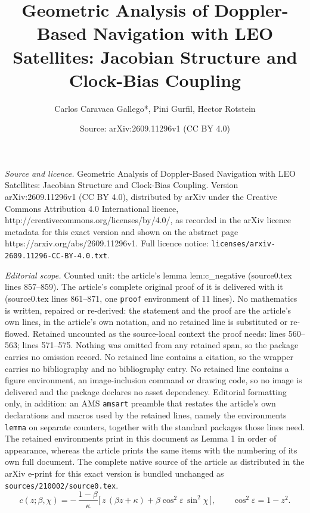 \documentclass[10pt,a4paper]{amsart}
\title{Geometric Analysis of Doppler-Based Navigation with LEO Satellites: Jacobian Structure and Clock-Bias Coupling}
\author{Carlos Caravaca Gallego*, Pini Gurfil, Hector Rotstein}
\date{Source: arXiv:2609.11296v1 (CC BY 4.0)}
\begin{document}
\maketitle

\noindent\emph{Source and licence.} Geometric Analysis of Doppler-Based Navigation with LEO Satellites: Jacobian Structure and Clock-Bias Coupling. Version arXiv:2609.11296v1 (CC BY 4.0), distributed by arXiv under the Creative Commons Attribution 4.0 International licence, http://creativecommons.org/licenses/by/4.0/, as recorded in the arXiv licence metadata for this exact version and shown on the abstract page https://arxiv.org/abs/2609.11296v1. Full licence notice: \texttt{licenses/arxiv-2609.11296-CC-BY-4.0.txt}.\par\smallskip

\noindent\textit{Editorial scope.} Counted unit: the article's lemma lem:c\_negative (source0.tex lines 857--859). The article's complete original proof of it is delivered with it (source0.tex lines 861--871, one \texttt{proof} environment of 11 lines). No mathematics is written, repaired or re-derived: the statement and the proof are the article's own lines, in the article's own notation, and no retained line is substituted or re-flowed.  Retained uncounted as the source-local context the proof needs: lines 560--563; lines 571--575.  Nothing was omitted from any retained span, so the package carries no omission record.  No retained line contains a citation, so the wrapper carries no bibliography and no bibliography entry.  No retained line contains a figure environment, an image-inclusion command or drawing code, so no image is delivered and the package declares no asset dependency.  Editorial formatting only, in addition: an AMS \texttt{amsart} preamble that restates the article's own declarations and macros used by the retained lines, namely the environments \texttt{lemma} on separate counters, together with the standard packages those lines need.  The retained environments print in this document as Lemma 1 in order of appearance, whereas the article prints the same items with the numbering of its own full document.  The complete native source of the article as distributed in the arXiv e-print for this exact version is bundled unchanged as \texttt{sources/210002/source0.tex}.
\begin{equation}\label{eq:coupling_analytical}
c(z;\beta,\chi) = -\,\frac{1-\beta}{\kappa}\Big[\,z\,(\beta z + \kappa) + \beta\cos^2\varepsilon\,\sin^2\chi\,\Big],
\qquad \cos^2\varepsilon = 1-z^2 .
\end{equation}
\end{document}
